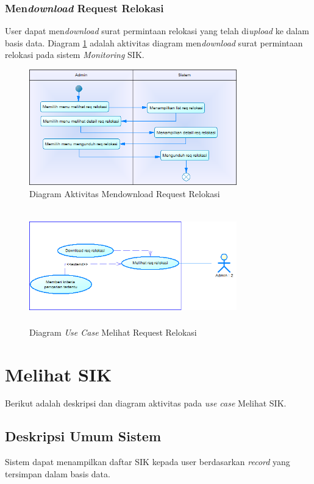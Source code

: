 	\subsubsection{Men\textit{download} Request Relokasi}
	User dapat men\textit{download} surat permintaan relokasi yang telah di\textit{upload} ke dalam basis data. Diagram \ref{figure:activity_mendownload_req_relokasi} adalah aktivitas diagram men\textit{download} surat permintaan relokasi pada sistem \textit{Monitoring} SIK.
	\begin{figure}[h]
	\centerline
	{\includegraphics[width=9cm,height=5cm]{bab4/ActivityDiagram_DownloadReqRelokasi.png}}
	\caption{Diagram Aktivitas Mendownload Request Relokasi}
	\label{figure:activity_mendownload_req_relokasi}
	\end{figure}

	\begin{figure}[h]
	\centerline
	{\includegraphics[width=9cm,height=5cm]{bab4/use-case-melihat-req-relokasi.png}}
	\caption{Diagram \textit{Use Case} Melihat Request Relokasi}
	\label{figure:use_case_melihat_req_relokasi}
	\end{figure}

\section{Melihat SIK}
Berikut adalah deskripsi dan diagram aktivitas pada \textit{use case} Melihat SIK.
\subsection{Deskripsi Umum Sistem}
\tab Sistem dapat menampilkan daftar SIK kepada user berdasarkan \textit{record} yang tersimpan dalam basis data.
